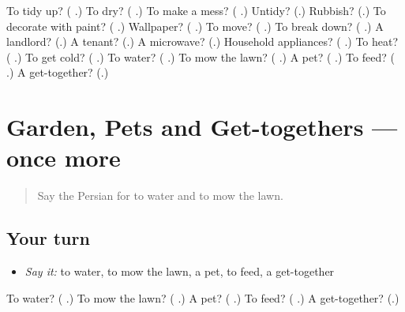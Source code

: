 \begin{tcolorbox}[breakable,colback=teal!4,colframe=teal!35!black,title={Before you move on}]
To tidy up? (\textbf{ }.) To dry? (\textbf{ }.) To make a mess? (\textbf{ }.) Untidy? (\textbf{}.) Rubbish? (\textbf{}.) To decorate with paint? (\textbf{ }.) Wallpaper? (\textbf{ }.) To move? (\textbf{ }.) To break down? (\textbf{ }.) A landlord? (\textbf{}.) A tenant? (\textbf{}.) A microwave? (\textbf{}.) Household appliances? (\textbf{ }.) To heat? (\textbf{ }.) To get cold? (\textbf{ }.) To water? (\textbf{ }.) To mow the lawn? (\textbf{ }.) A pet? (\textbf{ }.) To feed? (\textbf{ }.) A get-together? (\textbf{}.)
\end{tcolorbox}
\section[(dialogue)]{Garden, Pets and Get-togethers — once more}

\label{lesson:FA-R539-review-final-539}



\begin{quote}
Say the Persian for to water and to mow the lawn.
\end{quote}

\subsection*{Your turn}
\begin{itemize}
\raggedright
  \item \emph{Say it:} to water, to mow the lawn, a pet, to feed, a get-together
\end{itemize}

\begin{tcolorbox}[breakable,colback=teal!4,colframe=teal!35!black,title={Before you move on}]
To water? (\textbf{ }.) To mow the lawn? (\textbf{ }.) A pet? (\textbf{ }.) To feed? (\textbf{ }.) A get-together? (\textbf{}.)
\end{tcolorbox}
